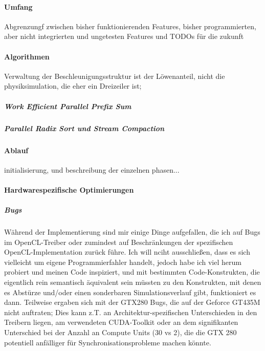 	\paragraph{Umfang}
		Abgrenzungf zwischen bisher funktionierenden Features, bisher programmierten, aber nicht integrierten und 
		ungetesten Features und TODOs für die zukunft

	\paragraph{Algorithmen}
	Verwaltung der Beschleunigungsstruktur ist der Löwenanteil, nicht die physiksimulation, die eher ein Dreizeiler 
	ist;
		\subparagraph{Work Efficient Parallel Prefix Sum}
		
		\subparagraph{Parallel Radix Sort und Stream Compaction}
		
	\paragraph{Ablauf}
		\label{sec:fluidSim:ablauf}
		initialisierung, und beschreibung der einzelnen phasen...

	\paragraph{Hardwarespezifische Optimierungen}
	\label{sec:hardwareOptimizations}
	
		\subparagraph{Bugs}
		\label{sec:oclBugs}
		Während der Implementierung sind mir einige Dinge aufgefallen, die ich auf Bugs im OpenCL-Treiber
		oder zumindest auf Beschränkungen der spezifischen OpenCL-Implementation zurück führe.
		Ich will nciht ausschließen, dass es sich vielleicht um eigene Programmierfahler handelt, jedoch habe ich
		viel herum probiert und meinen Code inspiziert, und mit bestimmten Code-Konstrukten, die eigentlich
		rein semantisch äquivalent sein müssten zu den Konstrukten, mit denen es Abstürze und/oder einen sonderbaren
		Simulationsverlauf gibt, funktioniert es dann.
		Teilweise ergaben sich mit der GTX280 Bugs, die auf der Geforce GT435M nicht auftraten;
		Dies kann z.T. an Architektur-spezifischen Unterschieden in den Treibern liegen, am verwendeten
		CUDA-Toolkit oder an dem signifikanten Unterschied bei der Anzahl an Compute Units (30 vs 2), die die
		GTX 280 potentiell anfälliger für Synchronisationsprobleme machen könnte.
		
